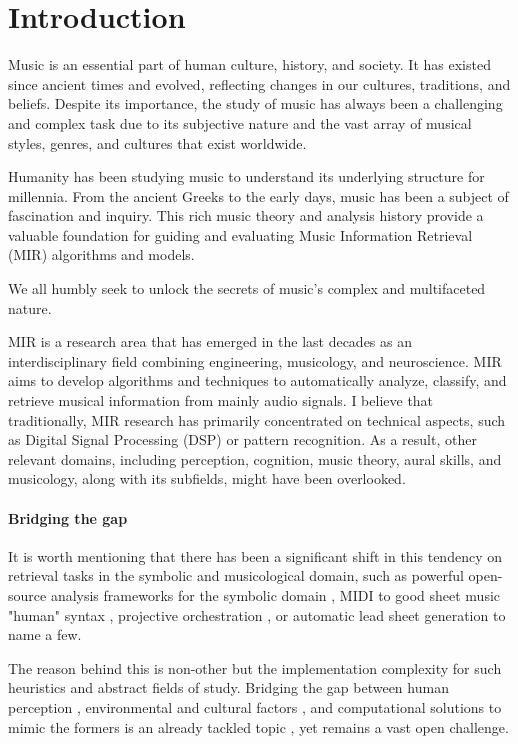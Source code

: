 \chapter{Introduction}

Music is an essential part of human culture, history, and society. It has existed since ancient times and evolved, reflecting changes in our cultures, traditions, and beliefs. Despite its importance, the study of music has always been a challenging and complex task due to its subjective nature and the vast array of musical styles, genres, and cultures that exist worldwide.

Humanity has been studying music to understand its underlying structure for millennia. From the ancient Greeks to the early days, music has been a subject of fascination and inquiry. This rich music theory and analysis history provide a valuable foundation for guiding and evaluating Music Information Retrieval (MIR) algorithms and models. 

We all humbly seek to unlock the secrets of music's complex and multifaceted nature.

MIR is a research area that has emerged in the last decades as an interdisciplinary field combining engineering, musicology, and neuroscience. MIR aims to develop algorithms and techniques to automatically analyze, classify, and retrieve musical information from mainly audio signals. I believe that traditionally, MIR research has primarily concentrated on technical aspects, such as Digital Signal Processing (DSP) or pattern recognition. As a result, other relevant domains, including perception, cognition, music theory, aural skills, and musicology, along with its subfields, might have been overlooked. 

\subsubsection{Bridging the gap}

It is worth mentioning that there has been a significant shift in this tendency on retrieval tasks in the symbolic and musicological domain, such as powerful open-source analysis frameworks for the symbolic domain \cite{ScottCuthbertChristopherArizaMusic21:Data}, MIDI to good sheet music "human" syntax \cite{Suzuki2021ScoreRepresentation}, projective orchestration \cite{Crestel2018AOrchestration}, or automatic lead sheet generation \cite{WeilAutomaticSignals} to name a few.

The reason behind this is non-other but the implementation complexity for such heuristics and abstract fields of study. Bridging the gap between human perception \cite{Large1994ResonanceMeter}\cite{Thaut2014HumanPatter}, environmental and cultural factors \cite{Sears2014PerceivingCadence}, and computational solutions to mimic the formers \cite{Mullensiefen2003MeasuringJudgments} is an already tackled topic \cite{Hernandez-Olivan2023SymbolicMethods}, yet remains a vast open challenge.